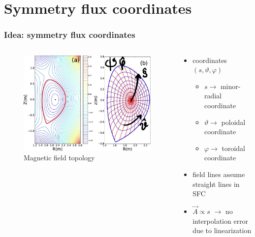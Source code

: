 \documentclass{beamer}
\begin{document}
\section{Symmetry flux coordinates}
\begin{frame}
\frametitle{Idea: symmetry flux coordinates}
\vspace{-1 cm}
\begin{columns}[onlytextwidth]
	\begin{column}{0.5\textwidth}
		\begin{center}
			\begin{figure}
				\includegraphics[trim={0 0cm 0 0cm},clip,width=1\textwidth]{FIGURES/magnetic_field_labeled0.jpg}
				\caption{Magnetic field topology}
			\end{figure}
		\end{center}
	\end{column}
	\begin{column}{0.5\textwidth}
		\vspace{0 cm}
		\begin{center}
			\begin{itemize}
				\item coordinates $(s,\vartheta,\varphi)$\\
							\begin{itemize}
					\item $s\rightarrow$ minor-radial coordinate
					\item $\vartheta \rightarrow$ poloidal coordinate
					\item $\varphi \rightarrow$ toroidal coordinate
				\end{itemize}
				\item field lines assume straight lines in SFC
				\item $\vec{A}\propto s$
				$\rightarrow$ no interpolation error due to linearization
			\end{itemize}
		\end{center}
	\end{column}
\end{columns}
\end{frame}
\end{document}
